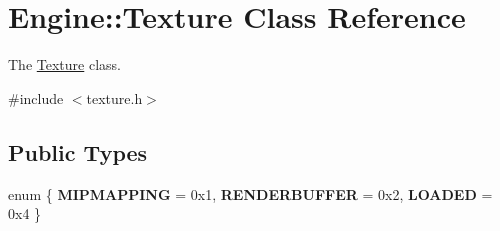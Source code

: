 \hypertarget{classEngine_1_1Texture}{}\section{Engine\+:\+:Texture Class Reference}
\label{classEngine_1_1Texture}


The \hyperlink{classEngine_1_1Texture}{Texture} class.  




{\ttfamily \#include $<$texture.\+h$>$}

\subsection*{Public Types}
\begin{DoxyCompactItemize}
\item 
\hypertarget{classEngine_1_1Texture_a9611740317327e13a551a3fba5d9ca11}{}enum \{ {\bfseries M\+I\+P\+M\+A\+P\+P\+I\+N\+G} = 0x1, 
{\bfseries R\+E\+N\+D\+E\+R\+B\+U\+F\+F\+E\+R} = 0x2, 
{\bfseries L\+O\+A\+D\+E\+D} = 0x4
 \}\label{classEngine_1_1Texture_a9611740317327e13a551a3fba5d9ca11}

\end{DoxyCompactItemize}
